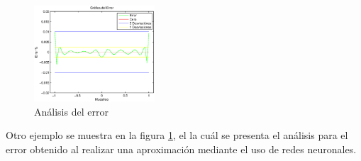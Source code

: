\begin{figure}[!htbp]
        \centering
        \includegraphics[width=0.4\textwidth]{images/error.eps}
        \caption{\footnotesize{Análisis del error}}
        \label{figuram99}
\end{figure}

Otro ejemplo se muestra en la figura \ref{figuram99}, el la cuál se presenta el análisis para el error obtenido al realizar una aproximación mediante el uso de redes neuronales.
